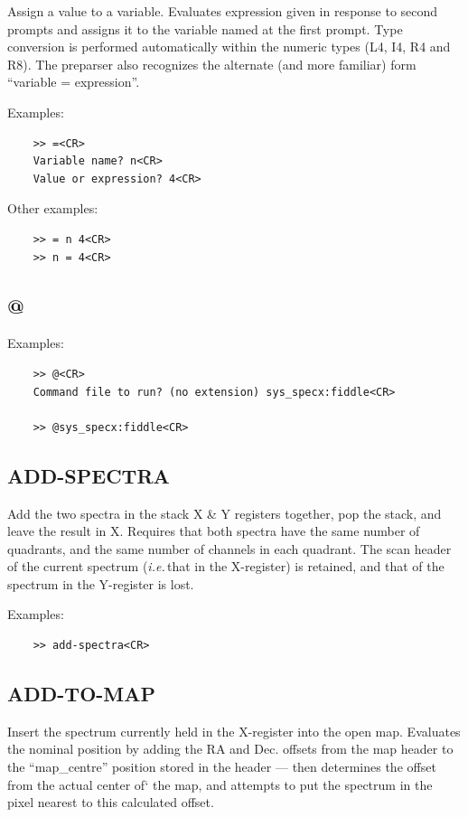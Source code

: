 \documentclass[11pt,twoside]{report}
\newcommand{\ie}{{\it i.e.\,}}
\begin{document}
Assign a value to a variable. Evaluates expression given in response to
second prompts and assigns it to the variable named at the first prompt.
Type conversion is performed automatically within the numeric types (L4, I4,
R4 and R8). The preparser also recognizes the alternate (and more familiar)
form ``variable = expression''.

Examples:
\begin{verbatim}
    >> =<CR>
    Variable name? n<CR>
    Value or expression? 4<CR>
\end{verbatim}
Other examples:
\begin{verbatim}
    >> = n 4<CR>
    >> n = 4<CR>
\end{verbatim}

\subsection{@}  
Examples:
\begin{verbatim}
    >> @<CR>
    Command file to run? (no extension) sys_specx:fiddle<CR>

    >> @sys_specx:fiddle<CR>
\end{verbatim}

\subsection{ADD-SPECTRA} 

Add the two spectra in the stack X \& Y registers together, pop the stack,
and leave the result in X. Requires that both spectra have the same number
of quadrants, and the same number of channels in each quadrant. The scan 
header of the current spectrum (\ie that in the X-register) is retained,
and that of the spectrum in the Y-register is lost.

Examples:
\begin{verbatim}
    >> add-spectra<CR>
\end{verbatim}

\subsection{ADD-TO-MAP} 

Insert the spectrum currently held in the X-register into the open map.
Evaluates the nominal position by adding the RA and Dec. offsets from the
map header to the ``map\_centre'' position stored in the header --- then
determines the offset from the actual center of` the map, and attempts to
put the spectrum in the pixel nearest to this calculated offset. 
\end{document}
